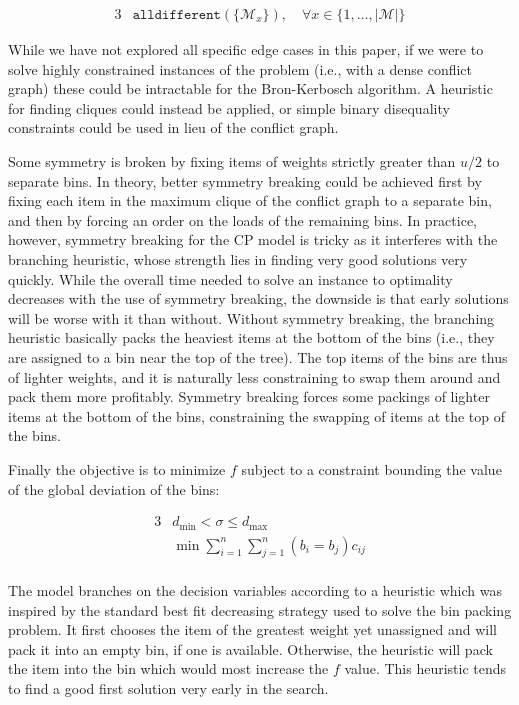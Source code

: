\documentclass{llncs}
\begin{document}
\begin{alignat}{3}
  & \texttt{alldifferent}\left( \{\mathcal{M}_{x}\} \right), \quad \forall x \in \{1, \dots, |\mathcal{M}|\}
\end{alignat}

While we have not explored all specific edge cases in this paper, if we were to solve highly constrained instances of the problem (i.e., with a dense conflict graph) these could be intractable for the Bron-Kerbosch algorithm. A heuristic for finding cliques could instead be applied, or simple binary disequality constraints could be used in lieu of the conflict graph.


Some symmetry is broken by fixing items of weights strictly greater than $u/2$ to separate bins. In theory, better symmetry breaking could be achieved first by fixing each item in the maximum clique of the conflict graph to a separate bin, and then by forcing an order on the loads of the remaining bins. In practice, however, symmetry breaking for the CP model is tricky as it interferes with the branching heuristic, whose strength lies in finding very good solutions very quickly. While the overall time needed to solve an instance to optimality decreases with the use of symmetry breaking, the downside is that early solutions will be worse with it than without. Without symmetry breaking, the branching heuristic basically packs the heaviest items at the bottom of the bins (i.e., they are assigned to a bin near the top of the tree). The top items of the bins are thus of lighter weights, and it is naturally less constraining to swap them around and pack them more profitably. Symmetry breaking forces some packings of lighter items at the bottom of the bins, constraining the swapping of items at the top of the bins.

Finally the objective is to minimize $f$ subject to a constraint bounding the value of the global deviation of the bins:

\begin{alignat}{3}
  & d_{\min} < \sigma \leq d_{\max} \\
  & \min \sum\limits_{i=1}^{n} \sum\limits_{j=1}^{n} \left( b_{i} = b_{j} \right) c_{ij}
\end{alignat}

\paragraph{}The model branches on the decision variables according to a heuristic which was inspired by the standard best fit decreasing strategy used to solve the bin packing problem. It first chooses the item of the greatest weight yet unassigned and will pack it into an empty bin, if one is available. Otherwise, the heuristic will pack the item into the bin which would most increase the $f$ value. This heuristic tends to find a good first solution very early in the search.
\end{document}
